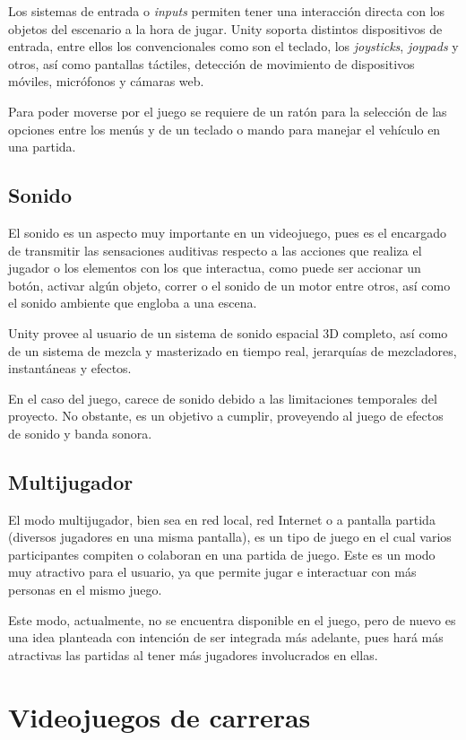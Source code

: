 Los sistemas de entrada o \textit{inputs} permiten tener una interacción directa con los objetos del escenario a la hora de jugar. Unity soporta distintos dispositivos de entrada, entre ellos los convencionales como son el teclado, los \textit{joysticks}, \textit{joypads} y otros, así como pantallas táctiles, detección de movimiento de dispositivos móviles, micrófonos y cámaras web.

Para poder moverse por el juego se requiere de un ratón para la selección de las opciones entre los menús y de un teclado o mando para manejar el vehículo en una partida.

\subsection{Sonido}

El sonido es un aspecto muy importante en un videojuego, pues es el encargado de transmitir las sensaciones auditivas respecto a las acciones que realiza el jugador o los elementos con los que interactua, como puede ser accionar un botón, activar algún objeto, correr o el sonido de un motor entre otros, así como el sonido ambiente que engloba a una escena.

Unity provee al usuario de un sistema de sonido espacial 3D completo, así como de un sistema de mezcla y masterizado en tiempo real, jerarquías de mezcladores, instantáneas y efectos.

En el caso del juego, carece de sonido debido a las limitaciones temporales del proyecto. No obstante, es un objetivo a cumplir, proveyendo al juego de efectos de sonido y banda sonora.

\subsection{Multijugador}

El modo multijugador, bien sea en red local, red Internet o a pantalla partida (diversos jugadores en una misma pantalla), es un tipo de juego en el cual varios participantes compiten o colaboran en una partida de juego. Este es un modo muy atractivo para el usuario, ya que permite jugar e interactuar con más personas en el mismo juego.

Este modo, actualmente, no se encuentra disponible en el juego, pero de nuevo es una idea planteada con intención de ser integrada más adelante, pues hará más atractivas las partidas al tener más jugadores involucrados en ellas.

\section{Videojuegos de carreras} 


